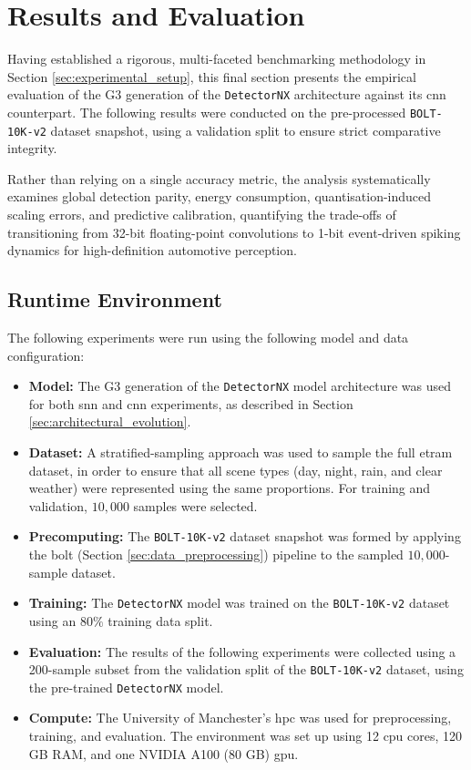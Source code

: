 \chapter{Results and Evaluation}
\label{cha:results_evaluation}

Having established a rigorous, multi-faceted benchmarking methodology in Section \ref{sec:experimental_setup},
this final section presents the empirical evaluation of the G3 generation of the \texttt{DetectorNX} architecture against its \gls{cnn} counterpart.
The following results were conducted on the pre-processed \texttt{BOLT-10K-v2} dataset snapshot, using a validation split to ensure strict comparative integrity.

Rather than relying on a single accuracy metric, the analysis systematically examines global detection parity, energy consumption, quantisation-induced scaling errors, and predictive calibration, quantifying the trade-offs of transitioning from 32-bit floating-point convolutions to 1-bit event-driven spiking dynamics for high-definition automotive perception.

\section{Runtime Environment}
\label{subsec:runtime_environment}
The following experiments were run using the following model and data configuration:

\begin{itemize}
    \item \textbf{Model:} The G3 generation of the \texttt{DetectorNX} model architecture was used for both \gls{snn} and \gls{cnn} experiments, as described in Section \ref{sec:architectural_evolution}.
    \item \textbf{Dataset:} A stratified-sampling approach was used to sample the full \gls{etram} dataset, in order to ensure that all scene types (day, night, rain, and clear weather) were represented using the same proportions. For training and validation, $10,000$ samples were selected.
    \item \textbf{Precomputing:} The \texttt{BOLT-10K-v2} dataset snapshot was formed by applying the \gls{bolt} (Section \ref{sec:data_preprocessing}) pipeline to the sampled $10,000$-sample dataset.
    \item \textbf{Training:} The \texttt{DetectorNX} model was trained on the \texttt{BOLT-10K-v2} dataset using an $80\%$ training data split.
    \item \textbf{Evaluation:} The results of the following experiments were collected using a 200-sample subset from the validation split of the \texttt{BOLT-10K-v2} dataset, using the pre-trained \texttt{DetectorNX} model.
    \item \textbf{Compute:} The University of Manchester's \gls{hpc} was used for preprocessing, training, and evaluation. The environment was set up using 12 \gls{cpu} cores, 120 GB RAM, and one NVIDIA A100 (80 GB) \gls{gpu}.
\end{itemize}








